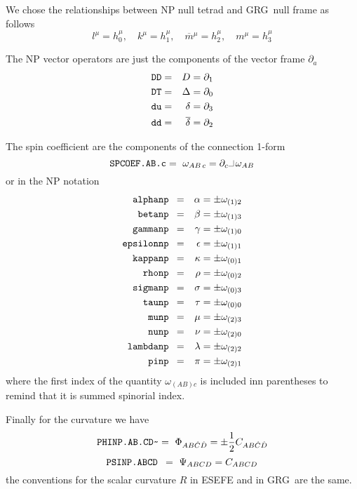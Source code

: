 \documentclass[twoside,openright]{report}
\newcommand{\grgtt}{\ttfamily}
\newcommand{\object}[2]{%
\begin{equation}
\mbox{\comm{#1}} =\ #2
\end{equation}}
\newcommand{\ipr}{\rule{1.8mm}{.1mm}\rule{.1mm}{2.2mm}\,} %
\renewcommand{\tt}{\grgtt}
\newcommand{\cc}{{\tt \char'176}}           %
\newcommand{\grg}{{\sc GRG}}
\newcommand{\comm}[1]{{\upshape\tt#1}}    %
\begin{document}
We chose the relationships between NP null tetrad and \grg\ null
frame as follows
\begin{equation}
l^\mu=h^\mu_0,\quad
k^\mu=h^\mu_1,\quad
\overline{m}\!{}^\mu=h^\mu_2,\quad
m^\mu=h^\mu_3
\end{equation}

The NP vector operators are just the components of the
vector frame $\partial_a$
\begin{eqnarray}
\mbox{\tt DD}&=& D =\partial_1 \\
\mbox{\tt DT}&=& \Delta=\partial_0 \\
\mbox{\tt du}&=& \delta=\partial_3 \\
\mbox{\tt dd}&=& \overline\delta=\partial_2
\end{eqnarray}

The spin coefficient are the components of the connection
1-form
\object{SPCOEF.AB.c}{ \omega_{AB\,c}=\partial_c\ipr\omega_{AB}}
or in the NP notation
\begin{eqnarray}
\mbox{\tt alphanp      }&=& \alpha =\pm\omega_{(1)2} \\
\mbox{\tt betanp       }&=& \beta =\pm\omega_{(1)3} \\
\mbox{\tt gammanp      }&=& \gamma =\pm\omega_{(1)0} \\
\mbox{\tt epsilonnp    }&=& \epsilon =\pm\omega_{(1)1} \\
\mbox{\tt kappanp      }&=& \kappa =\pm\omega_{(0)1} \\
\mbox{\tt rhonp        }&=& \rho =\pm\omega_{(0)2} \\
\mbox{\tt sigmanp      }&=& \sigma =\pm\omega_{(0)3} \\
\mbox{\tt taunp        }&=& \tau =\pm\omega_{(0)0} \\
\mbox{\tt munp         }&=& \mu =\pm\omega_{(2)3} \\
\mbox{\tt nunp         }&=& \nu =\pm\omega_{(2)0} \\
\mbox{\tt lambdanp     }&=& \lambda =\pm\omega_{(2)2} \\
\mbox{\tt pinp         }&=& \pi =\pm\omega_{(2)1} \\
\end{eqnarray}
where the first index of the
quantity $\omega_{(AB)c}$ is included inn parentheses to remind
that it is summed spinorial index.

Finally for the curvature we have
\object{PHINP.AB.CD\cc }{
\Phi_{AB\dot{C}\dot{D}} = \pm\frac{1}{2}C_{AB\dot C\dot D} }
\object{PSINP.ABCD }{\Psi_{ABCD}=C_{ABCD}}
the conventions for the scalar curvature $R$ in ESEFE and
in \grg\ are the same.
\end{document}
